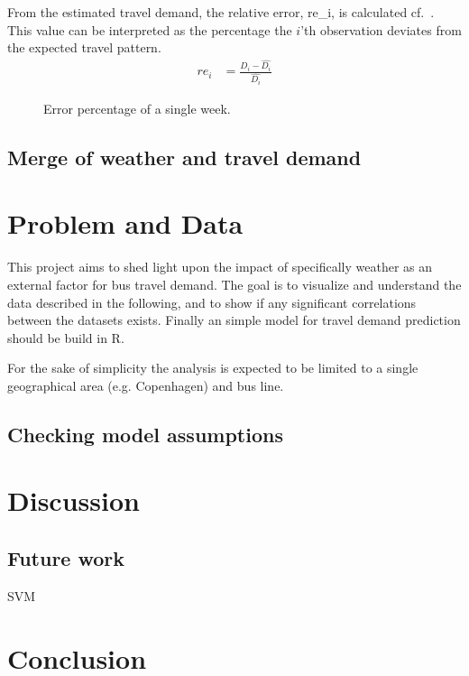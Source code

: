 \documentclass[a4paper,11pt]{article}
\begin{document}
From the estimated travel demand, the relative error, \gls{re_i}, is calculated cf.~. This value can be interpreted as the percentage the $i$'th observation deviates from the expected travel pattern.
\begin{align}
    \mathit{re}_i &= \frac{D_i - \widehat{D_i}}{\widehat{D_i}}
    \label{eq:error}
\end{align}

\begin{figure}[!ht]
    \center
    
    \caption{Error percentage of a single week.}
    \label{fig:travelcard_error_pct}
\end{figure}

\subsection{Merge of weather and travel demand}


\clearpage

\section{Problem and Data}\label{ch:data_old}
This project aims to shed light upon the impact of specifically weather as an external factor for bus travel demand. The goal is to visualize and understand the data described in the following, and to show if any significant correlations between the datasets exists. Finally an simple model for travel demand prediction should be build in R.

For the sake of simplicity the analysis is expected to be limited to a single geographical area (e.g. Copenhagen) and bus line.

\subsection{Checking model assumptions}

\section{Discussion}

\subsection{Future work}
SVM 

\section{Conclusion}
\end{document}
